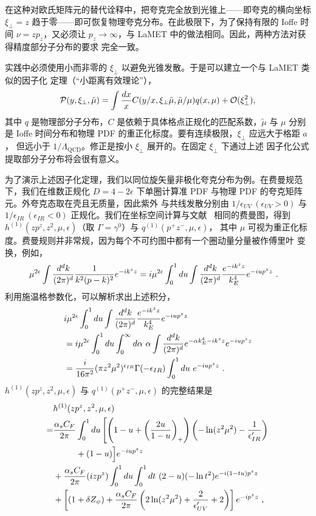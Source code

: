 在这种对欧氏矩阵元的替代诠释中，把夸克完全放到光锥上——即夸克的横向坐标 $\xi_\perp = z$
趋于零——即可恢复物理夸克分布。在此极限下，为了保持有限的 Ioffe 时间 $\nu = zp_z$，又必须让
$p_z \rightarrow\infty$，与 LaMET 中的做法相同。因此，两种方法对获得精度部分子分布的要求
完全一致。

实践中必须使用小而非零的 $\xi_\perp$ 以避免光锥发散。于是可以建立一个与 LaMET 类似的因子化
定理（``小距离有效理论''），
\begin{equation}
{\cal P}(y, \xi_\perp,\tilde{\mu}) = \int \frac{dx}{x}
C(y/x, \xi_\perp\tilde{\mu},\tilde{\mu}/\mu) q(x, \mu) + {\cal O}(\xi^2_\perp),
\label{fac2}
\end{equation}
其中 $q$ 是物理部分子分布，$C$ 是依赖于具体格点正规化的匹配系数，$\tilde{\mu}$ 与 $\mu$
分别是 Ioffe 时间分布和物理 PDF 的重正化标度。要有连续极限，$\xi_\perp$ 应远大于格距 $a$，
但远小于 $1/\Lambda_{\text{QCD}}$。修正是按小 $\xi_\perp$ 展开的。在固定 $\xi_\perp$ 下通过上述
因子化公式提取部分子分布将会很有意义。

为了演示上述因子化定理，我们以同位旋矢量非极化夸克分布为例。在费曼规范下，我们在维数正规化
$D=4-2\epsilon$ 下单圈计算准 PDF 与物理 PDF 的夸克矩阵元。外夸克态取在壳且无质量，因此紫外
与共线发散分别由 $1/\epsilon_{UV}\ (\epsilon_{UV}>0)$ 与 $1/\epsilon_{IR}\ (\epsilon_{IR}<0)$
正规化。我们在坐标空间计算与文献~\cite{Xiong:2013bka} 相同的费曼图，得到
$h^{(1)}(zp^z,z^2,\mu,\epsilon)$（取 $\Gamma=\gamma^0$）与 $q^{(1)}(p^+z^-,\mu,\epsilon)$，
其中 $\mu$ 可视为重正化标度。费曼规则并非常规，因为每个不可约图中都有一个圈动量分量被作傅里叶
变换，例如，
\begin{align}
\mu^{2\epsilon}\int {d^d k\over (2\pi)^d} {1\over k^2(p-k)^2} e^{-i k^z z} &=  i\mu^{2\epsilon}\int_0^1 du \int {d^d k\over (2\pi)^d} {e^{-i k^z z}\over k_E^4} e^{ -i u p^z z}\ .
\end{align}
利用施温格参数化，可以解析求出上述积分，
\begin{align}
&i\mu^{2\epsilon}\int_0^1 du\int {d^d k\over (2\pi)^d} {e^{-i k^z z}\over k_E^4} e^{-i u p^z z}\nonumber\\
&= i\mu^{2\epsilon}\int_0^1 du\int_0^\infty d\alpha\ \alpha\int {d^d k\over (2\pi)^d} e^{-\alpha k_E^4-i k^z z} e^{-i u p^z z} \nonumber\\
&= {i\over 16\pi^2}(\pi z^2\mu^2)^{\epsilon_{IR}} \Gamma(-\epsilon_{IR})\int_0^1 du\  e^{-iu p^z z}\ .
\end{align}
$h^{(1)}(zp^z,z^2,\mu,\epsilon)$ 与 $q^{(1)}(p^+z^-,\mu,\epsilon)$ 的完整结果是
\begin{align}
&h^{(1)}(zp^z,z^2,\mu,\epsilon)\nonumber\\
=&{\alpha_sC_F\over 2\pi}\int_0^1 du \left[\left(1-u+\left({2u\over 1-u}\right)_+\right)\left(-\ln(z^2 \mu^2) - {1\over \epsilon'_{IR}}\right)\right.\nonumber\\
&\ \ \ \ \ \ \ \ + (1-u)\Big]e^{-iu p^z z}\nonumber\\
& + {\alpha_sC_F\over 2\pi}(izp^z)\int_0^1 du \int_0^1dt\ (2-u) (-\ln t^2) e^{-i(1-tu) p^z z} \nonumber\\
&  +\left[(1+\delta Z_\psi)+ {\alpha_sC_F\over 2\pi}\left(2\ln(z^2\mu^2) + {2\over \epsilon'_{UV}}+2\right)\right] e^{-i p^z z} \ ,
\end{align}

